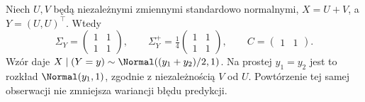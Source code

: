 \begin{przyklad}
Niech $U,V$ będą niezależnymi zmiennymi standardowo
normalnymi, $X=U+V$, a $Y=(U,U)^\top$.
Wtedy
\[
\Sigma_Y=\begin{pmatrix}1&1\\1&1\end{pmatrix},\qquad
\Sigma_Y^+=\tfrac14\begin{pmatrix}1&1\\1&1\end{pmatrix},
\qquad C=\begin{pmatrix}1&1\end{pmatrix}.
\]
Wzór daje $X\mid(Y=y)\sim
\Normal((y_1+y_2)/2,1)$. Na prostej $y_1=y_2$
jest to rozkład $\Normal(y_1,1)$, zgodnie z niezależnością
$V$ od $U$. Powtórzenie tej samej obserwacji nie
zmniejsza wariancji błędu predykcji.
\end{przyklad}

